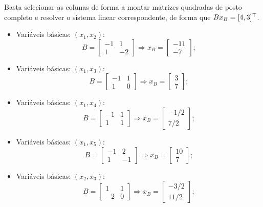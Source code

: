 \begin{questions}
\begin{solution}
    Basta selecionar as colunas de forma a montar matrizes quadradas de posto completo e resolver o sistema linear correspondente, de forma que ${B x_B = [4,3]^\top}$.
    \begin{itemize}
        \item Variáveis básicas: $(x_1,x_2)$: 
        \[
        B = 
        \begin{bmatrix}
            -1 & 1\\
            1 & -2
        \end{bmatrix}
        \Rightarrow
        x_B = \begin{bmatrix} -11\\ -7 \end{bmatrix};
        \]
        
        \item Variáveis básicas: $(x_1,x_3)$: 
        \[
        B = 
        \begin{bmatrix}
            -1 & 1\\
            1 & 0
        \end{bmatrix}
        \Rightarrow
        x_B = \begin{bmatrix} 3\\ 7 \end{bmatrix};
        \]
        
        \item Variáveis básicas: $(x_1,x_4)$: 
        \[
        B = 
        \begin{bmatrix}
            -1 & 1\\
            1 & 1
        \end{bmatrix}
        \Rightarrow
        x_B = \begin{bmatrix} -1/2\\ 7/2 \end{bmatrix};
        \]
        
        \item Variáveis básicas: $(x_1,x_5)$: 
        \[
        B = 
        \begin{bmatrix}
            -1 & 2\\
            1 & -1
        \end{bmatrix}
        \Rightarrow
        x_B = \begin{bmatrix} 10\\ 7 \end{bmatrix};
        \]
        
        \item Variáveis básicas: $(x_2,x_3)$: 
        \[
        B = 
        \begin{bmatrix}
            1 & 1\\
            -2 & 0
        \end{bmatrix}
        \Rightarrow
        x_B = \begin{bmatrix} -3/2\\ 11/2 \end{bmatrix};
        \]
        

\end{itemize}
\end{solution}
\end{questions}

